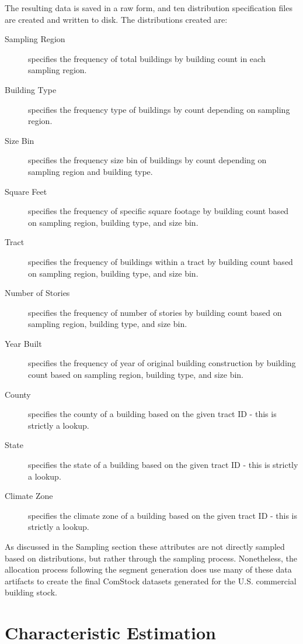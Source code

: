 The resulting data is saved in a raw form, and ten distribution specification files are created and written to disk. The distributions created are:
\begin{description}
\item [Sampling Region] specifies the frequency of total buildings by building count in each sampling region.
\item [Building Type] specifies the frequency type of buildings by count depending on sampling region.
\item [Size Bin] specifies the frequency size bin of buildings by count depending on sampling region and building type.
\item [Square Feet] specifies the frequency of specific square footage by building count based on sampling region, building type, and size bin.
\item [Tract] specifies the frequency of buildings within a tract by building count based on sampling region, building type, and size bin.
\item [Number of Stories] specifies the frequency of number of stories by building count based on sampling region, building type, and size bin.
\item [Year Built] specifies the frequency of year of original building construction by building count based on sampling region, building type, and size bin.
\item [County] specifies the county of a building based on the given tract ID - this is strictly a lookup.
\item [State] specifies the state of a building based on the given tract ID - this is strictly a lookup.
\item [Climate Zone] specifies the climate zone of a building based on the given tract ID - this is strictly a lookup.
\end{description}

As discussed in the Sampling section these attributes are not directly sampled based on distributions, but rather through the sampling process. Nonetheless, the allocation process following the segment generation does use many of these data artifacts to create the final ComStock datasets generated for the U.S. commercial building stock.

\section{Characteristic Estimation} \label{Characteristic Estimation}

